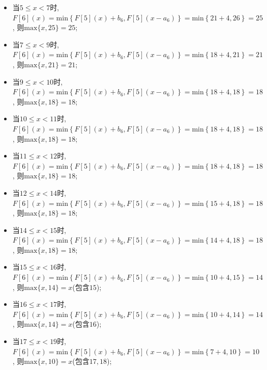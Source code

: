 \documentclass{article}
\begin{document}
\begin{homeworkProblem}
\begin{itemize}
\begin{itemize}
			\item 当$5\leq x<7$时, $F\left[ 6 \right] \left( x \right) =\text{min} \left\{ F\left[ 5 \right] \left( x \right) +b_6,F\left[ 5 \right] \left( x-a_6 \right) \right\} =\text{min} \left\{ 21+4,26 \right\} =25$, 则$\text{max}\{x,25\}=25$;
			\item 当$7\leq x<9$时, $F\left[ 6 \right] \left( x \right) =\text{min} \left\{ F\left[ 5 \right] \left( x \right) +b_6,F\left[ 5 \right] \left( x-a_6 \right) \right\} =\text{min} \left\{ 18+4,21 \right\} =21$, 则$\text{max}\{x,21\}=21$;
			\item 当$9\leq x<10$时, $F\left[ 6 \right] \left( x \right) =\text{min} \left\{ F\left[ 5 \right] \left( x \right) +b_6,F\left[ 5 \right] \left( x-a_6 \right) \right\} =\text{min} \left\{ 18+4,18 \right\} =18$, 则$\text{max}\{x,18\}=18$;
			\item 当$10\leq x<11$时, $F\left[ 6 \right] \left( x \right) =\text{min} \left\{ F\left[ 5 \right] \left( x \right) +b_6,F\left[ 5 \right] \left( x-a_6 \right) \right\} =\text{min} \left\{ 18+4,18 \right\} =18$, 则$\text{max}\{x,18\}=18$;
			\item 当$11\leq x<12$时, $F\left[ 6 \right] \left( x \right) =\text{min} \left\{ F\left[ 5 \right] \left( x \right) +b_6,F\left[ 5 \right] \left( x-a_6 \right) \right\} =\text{min} \left\{ 18+4,18 \right\} =18$, 则$\text{max}\{x,18\}=18$;
			\item 当$12\leq x<14$时, $F\left[ 6 \right] \left( x \right) =\text{min} \left\{ F\left[ 5 \right] \left( x \right) +b_6,F\left[ 5 \right] \left( x-a_6 \right) \right\} =\text{min} \left\{ 15+4,18 \right\} =18$, 则$\text{max}\{x,18\}=18$;
			\item 当$14\leq x<15$时, $F\left[ 6 \right] \left( x \right) =\text{min} \left\{ F\left[ 5 \right] \left( x \right) +b_6,F\left[ 5 \right] \left( x-a_6 \right) \right\} =\text{min} \left\{ 14+4,18 \right\} =18$, 则$\text{max}\{x,18\}=18$;
			\item 当$15\leq x<16$时, $F\left[ 6 \right] \left( x \right) =\text{min} \left\{ F\left[ 5 \right] \left( x \right) +b_6,F\left[ 5 \right] \left( x-a_6 \right) \right\} =\text{min} \left\{ 10+4,15 \right\} =14$, 则$\text{max}\{x,14\}=x$(包含$15$);
			\item 当$16\leq x<17$时, $F\left[ 6 \right] \left( x \right) =\text{min} \left\{ F\left[ 5 \right] \left( x \right) +b_6,F\left[ 5 \right] \left( x-a_6 \right) \right\} =\text{min} \left\{ 10+4,14 \right\} =14$, 则$\text{max}\{x,14\}=x$(包含$16$);
			\item 当$17\leq x<19$时, $F\left[ 6 \right] \left( x \right) =\text{min} \left\{ F\left[ 5 \right] \left( x \right) +b_6,F\left[ 5 \right] \left( x-a_6 \right) \right\} =\text{min} \left\{ 7+4,10 \right\} =10	$, 则$\text{max}\{x,10\}=x$(包含$17,18$);

\end{itemize}
\end{itemize}
\end{homeworkProblem}
\end{document}
